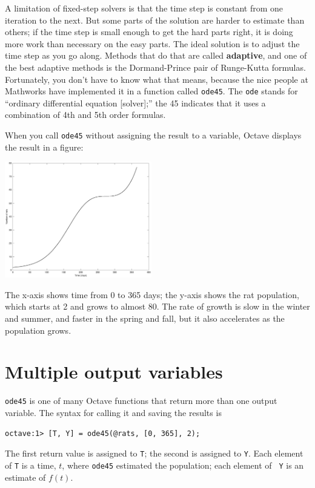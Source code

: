 \documentclass{book}
\begin{document}
A limitation of fixed-step solvers is that the time step is constant from
one iteration to the next. But some parts of the solution are
harder to estimate than others; if the time step is small enough to
get the hard parts right, it is doing more work than necessary on the
easy parts. The ideal solution is to adjust the time step as you go
along. Methods that do that are called {\bf adaptive}, and one of the
best adaptive methods is the Dormand-Prince pair of Runge-Kutta
formulas. Fortunately, you don't have to know what that means,
because the nice people at Mathworks have implemented it in a function
called {\tt ode45}. The {\tt ode} stands for ``ordinary differential
equation [solver];'' the 45 indicates that it uses a combination of
4th and 5th order formulas.


When you call {\tt ode45} without assigning the result to a variable,
Octave displays the result in a figure:

\beforefig \centerline{\includegraphics[height=2in]{figs/rats.eps}}

The x-axis shows time from 0 to 365 days; the y-axis shows the rat
population, which starts at 2 and grows to almost 80. The rate
of growth is slow in the winter and summer, and faster in the
spring and fall, but it also accelerates as the population grows.

\section{Multiple output variables}
\label{rats}

{\tt ode45} is one of many Octave functions that return more
than one output variable. The syntax for calling it and saving
the results is

\begin{verbatim}
octave:1> [T, Y] = ode45(@rats, [0, 365], 2);
\end{verbatim}

The first return value is assigned to {\tt T}; the second is assigned
to {\tt Y}. Each element of {\tt T} is a time,
$t$, where {\tt ode45} estimated the population; each element of {\tt
Y} is an estimate of $f(t)$.
\end{document}
